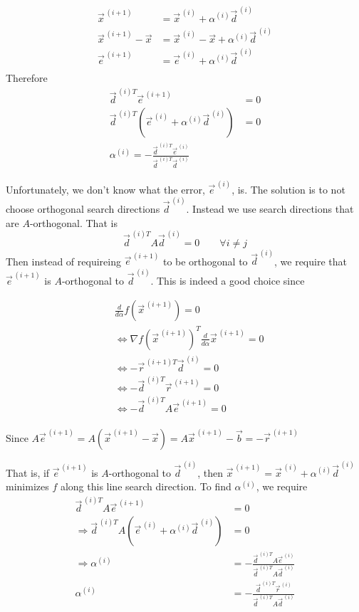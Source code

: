 \begin{align*}
    \vec{x}^{\,(i+1)} &= \vec{x}^{\,(i)}+ \alpha^{(i)}\vec{d}^{\,(i)} \\
    \vec{x}^{\,(i+1)} -\vec{x} &= \vec{x}^{\,(i)}- \vec{x}+ \alpha^{(i)}\vec{d}^{\,(i)}  \\
    \vec{e}^{\,(i+1)} &= \vec{e}^{\,(i)}+ \alpha^{(i)}\vec{d}^{\,(i)} \\
\end{align*}
Therefore
\begin{align*}
    \vec{d}^{\,(i)T}\vec{e}^{\,(i+1)} &= 0 \\
    \vec{d}^{\,(i)T}(\vec{e}^{\,(i)}+ \alpha^{(i)}\vec{d}^{\,(i)}) &= 0 \\
    \alpha^{(i)} = - \frac{\vec{d}^{\,(i)T}\vec{e}^{\,(i)}}{\vec{d}^{\,(i)T}\vec{d}^{\,(i)}}
\end{align*}

Unfortunately, we don't know what the error, $\vec{e}^{\,(i)}$, is. The solution is to not choose orthogonal search directions $\vec{d}^{\,(i)}$. Instead we use search directions that are $A$-orthogonal. That is
\begin{equation*}
    \vec{d}^{\,(i)T}A\vec{d}^{\,(i)} = 0 \qquad \forall i\neq j
\end{equation*}
Then instead of requireing $\vec{e}^{\,(i+1)}$ to be orthogonal to $\vec{d}^{\,(i)}$, we require that $\vec{e}^{\,(i+1)}$ is $A$-orthogonal to $\vec{d}^{\,(i)}$. This is indeed a good choice since

\begin{align*}
    &\frac{d}{d\alpha} f\left(\vec{x}^{\,(i+1)}\right) = 0 \\
    &\Leftrightarrow \nabla f\left(\vec{x}^{\,(i+1)}\right)^T \frac{d}{d\alpha}\vec{x}^{\,(i+1)} =0 \\
    &\Leftrightarrow -\vec{r}^{\,(i+1)T}\vec{d}^{\,(i)} = 0 \\
    &\Leftrightarrow -\vec{d}^{\,(i)T} \vec{r}^{\,(i+1)}= 0 \\
    &\Leftrightarrow -\vec{d}^{\,(i)T} A\vec{e}^{\,(i+1)}= 0 \\
\end{align*}

Since $A\vec{e}^{\,(i+1)} = A\left(\vec{x}^{\,(i+1)} -\vec{x}\right)=A\vec{x}^{\,(i+1)} - \vec{b} = -\vec{r}^{\,(i+1)}$

That is, if $\vec{e}^{\,(i+1)}$ is $A$-orthogonal to $\vec{d}^{\,(i)}$, then $\vec{x}^{\,(i+1)} = \vec{x}^{\,(i)} + \alpha^{(i)}\vec{d}^{\,(i)}$ minimizes $f$ along this line search direction. To find $\alpha^{(i)}$, we require
\begin{align*}
    \vec{d}^{\,(i)T}A\vec{e}^{\,(i+1)} &= 0 \\
    \Rightarrow\vec{d}^{\,(i)T}A(\vec{e}^{\,(i)}+ \alpha^{(i)}\vec{d}^{\,(i)}) &= 0 \\
    \Rightarrow\alpha^{(i)} &= - \frac{\vec{d}^{\,(i)T}A\vec{e}^{\,(i)}}{\vec{d}^{\,(i)T}A\vec{d}^{\,(i)}}\\
    \alpha^{(i)} &= - \frac{\vec{d}^{\,(i)T}\vec{r}^{\,(i)}}{\vec{d}^{\,(i)T}A\vec{d}^{\,(i)}}
\end{align*}

